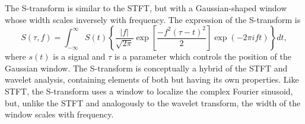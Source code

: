 The S-transform \cite[]{Stockwell1996} is similar to the STFT,
but with a Gaussian-shaped window whose width scales inversely
with frequency. The expression of the S-transform is
      \begin{equation}
          S(\tau,f)=\int_{-\infty}^{\infty}S(t)\left\{\frac{|f|}{\sqrt{2\pi}}\exp\left[ \frac{-f^2(\tau-t)^2}{2}\right ] \exp(-2\pi ift)\right\} dt,
        \label{eq:eq1}
      \end{equation} 
where $s(t)$ is a signal and $\tau$ is a parameter which controls the position
of the Gaussian window. The S-transform is conceptually a
hybrid of the STFT and wavelet analysis, containing elements of
both but having its own properties. Like STFT, the S-transform uses
a window to localize the complex Fourier sinusoid, but, unlike the
STFT and analogously to the wavelet transform, the width of the
window scales with frequency.

